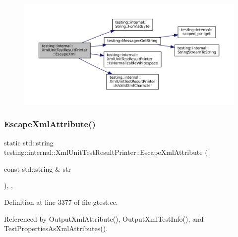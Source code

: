 \begin{figure}[H]
\begin{center}
\leavevmode
\includegraphics[width=350pt]{classtesting_1_1internal_1_1XmlUnitTestResultPrinter_adadf42cf46ade9b26743466ce4b52f36_cgraph}
\end{center}
\end{figure}
\mbox{\label{classtesting_1_1internal_1_1XmlUnitTestResultPrinter_aad574d7bb0c24578d5acc57817b9d367}} 
\subsubsection{\texorpdfstring{Escape\+Xml\+Attribute()}{EscapeXmlAttribute()}}
{\footnotesize\ttfamily static std\+::string testing\+::internal\+::\+Xml\+Unit\+Test\+Result\+Printer\+::\+Escape\+Xml\+Attribute (\begin{DoxyParamCaption}\item[{const std\+::string \&}]{str }\end{DoxyParamCaption})\hspace{0.3cm}{\ttfamily [inline]}, {\ttfamily [static]}, {\ttfamily [private]}}



Definition at line 3377 of file gtest.\+cc.



Referenced by Output\+Xml\+Attribute(), Output\+Xml\+Test\+Info(), and Test\+Properties\+As\+Xml\+Attributes().


